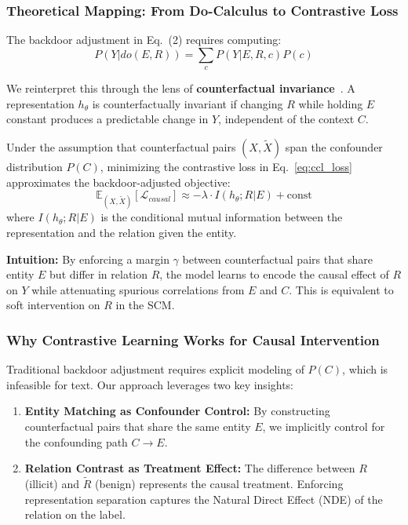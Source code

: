 \documentclass{acmart}
\begin{document}
\subsubsection{Theoretical Mapping: From Do-Calculus to Contrastive Loss}

The backdoor adjustment in Eq.~(2) requires computing:
\begin{equation}
P(Y | do(E, R)) = \sum_{c} P(Y | E, R, c) P(c)
\end{equation}

We reinterpret this through the lens of \textbf{counterfactual invariance}~\cite{veitch2021counterfactual}. A representation $h_\theta$ is counterfactually invariant if changing $R$ while holding $E$ constant produces a predictable change in $Y$, independent of the context $C$.

\begin{lemma}
\label{lem:contrastive_backdoor}
Under the assumption that counterfactual pairs $(X, \tilde{X})$ span the confounder distribution $P(C)$, minimizing the contrastive loss in Eq.~\ref{eq:ccl_loss} approximates the backdoor-adjusted objective:
\begin{equation}
\mathbb{E}_{(X,\tilde{X})} \left[ \mathcal{L}_{causal} \right] \approx -\lambda \cdot I(h_\theta; R | E) + \text{const}
\end{equation}
where $I(h_\theta; R | E)$ is the conditional mutual information between the representation and the relation given the entity.
\end{lemma}

\textbf{Intuition:} By enforcing a margin $\gamma$ between counterfactual pairs that share entity $E$ but differ in relation $R$, the model learns to encode the causal effect of $R$ on $Y$ while attenuating spurious correlations from $E$ and $C$. This is equivalent to soft intervention on $R$ in the SCM.

\subsubsection{Why Contrastive Learning Works for Causal Intervention}

Traditional backdoor adjustment requires explicit modeling of $P(C)$, which is infeasible for text. Our approach leverages two key insights:

\begin{enumerate}
\item \textbf{Entity Matching as Confounder Control:} By constructing counterfactual pairs that share the same entity $E$, we implicitly control for the confounding path $C \rightarrow E$.

\item \textbf{Relation Contrast as Treatment Effect:} The difference between $R$ (illicit) and $\tilde{R}$ (benign) represents the causal treatment. Enforcing representation separation captures the Natural Direct Effect (NDE) of the relation on the label.
\end{enumerate}
\end{document}
